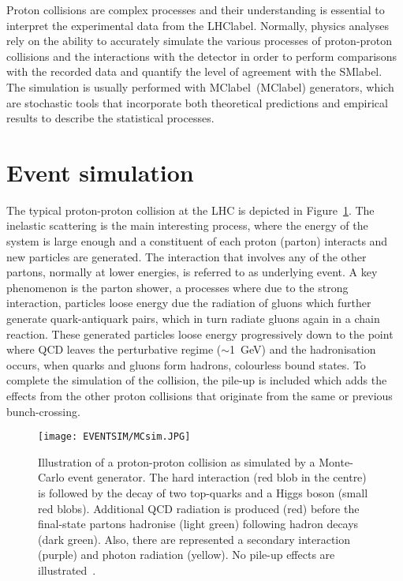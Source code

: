 Proton collisions are complex processes and their understanding is essential to interpret the experimental data from the \acrshort{LHClabel}. Normally, physics analyses rely on the ability to accurately simulate the various processes of proton-proton collisions and the interactions with the detector in order to perform comparisons with the recorded data and quantify the level of agreement with the \acrshort{SMlabel}. The simulation is usually performed with \acrlong{MClabel}~(\acrshort{MClabel}) generators, which are stochastic tools that incorporate both theoretical predictions and empirical results to describe the statistical processes.

\section{Event simulation}

The typical proton-proton collision at the LHC is depicted in Figure~\ref{figEVNTSIM:MCsim}. The inelastic scattering is the main interesting process, where the energy of the system is large enough and a constituent of each proton (parton) interacts and new particles are generated. The interaction that involves any of the other partons, normally at lower energies, is referred to as underlying event. A key phenomenon is the parton shower, a processes where due to the strong interaction, particles loose energy due the radiation of gluons which further generate quark-antiquark pairs, which in turn radiate gluons again in a chain reaction. These generated particles loose energy progressively down to the point where \acrshort{QCD} leaves the perturbative regime ($\sim$1~GeV) and the hadronisation occurs, when quarks and gluons form hadrons, colourless bound states. To complete the simulation of the collision, the pile-up is included which adds the effects from the other proton collisions that originate from the same or previous bunch-crossing.  

\begin{figure}[htbp]
    \RawFloats
    \begin{center}
    \texttt{[image: EVENTSIM/MCsim.JPG]}
    \caption{
        Illustration of a proton-proton collision as simulated by a Monte-Carlo event generator. The hard interaction (red blob in the centre) is followed by the decay of two top-quarks and a Higgs boson (small red blobs). Additional QCD radiation is produced (red) before the final-state partons hadronise (light green) following hadron decays (dark green). Also, there are represented a secondary interaction (purple) and photon radiation (yellow). No pile-up effects are illustrated~\cite{Gleisberg_2009}. 
    }
    \label{figEVNTSIM:MCsim}
    \end{center}
\end{figure}


